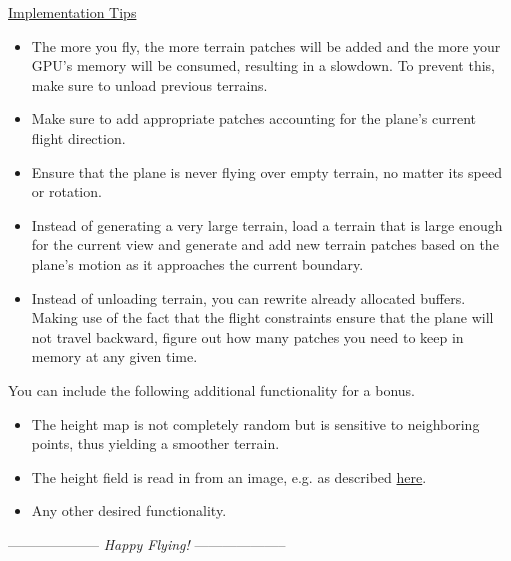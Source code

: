 \documentclass[addpoints]{exam}
\begin{document}
\begin{questions}
    \noindent\underline{Implementation Tips}
    \begin{itemize}
    \item The more you fly, the more terrain patches will be added and the more your GPU's memory will be consumed, resulting in a slowdown. To prevent this, make sure to unload previous terrains.
    \item Make sure to add appropriate patches accounting for the plane's current flight direction. 
    \item Ensure that the plane is never flying over empty terrain, no matter its speed or rotation.
    \item Instead of generating a very large terrain, load a terrain that is large enough for the current view and generate and add new terrain patches based on the plane's motion as it approaches the current boundary.
    \item Instead of unloading terrain, you can rewrite already allocated buffers. Making use of the fact that the flight constraints ensure that the plane will not travel backward, figure out how many patches you need to keep in memory at any given time.
    \end{itemize}
    
  You can include the following additional functionality for a bonus.
  \begin{itemize}
  \item The height map is not completely random but is sensitive to neighboring points, thus yielding a smoother terrain.
  \item The height field is read in from an image, e.g. as described \href{http://www.cs.cmu.edu/~jkh/462_s07/assts/assignment1/}{here}.
  \item Any other desired functionality.
  \end{itemize}
\end{questions}
\bigskip
  \centerline{-------------------- \textit{Happy Flying!} --------------------}
\end{document}
